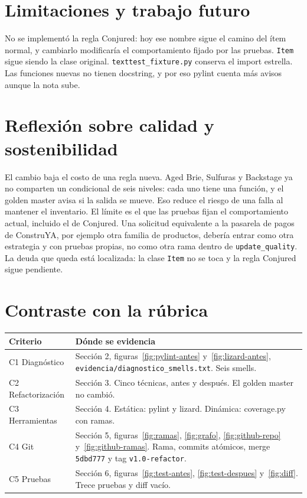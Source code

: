 \documentclass[10pt,a4paper]{article}
\begin{document}
\section{Limitaciones y trabajo futuro}
No se implementó la regla Conjured: hoy ese nombre sigue el camino del ítem normal, y cambiarlo modificaría el comportamiento fijado por las pruebas. \texttt{Item} sigue siendo la clase original. \texttt{texttest\_fixture.py} conserva el import estrella. Las funciones nuevas no tienen docstring, y por eso pylint cuenta más avisos aunque la nota sube.

\section{Reflexión sobre calidad y sostenibilidad}
El cambio baja el costo de una regla nueva. Aged Brie, Sulfuras y Backstage ya no comparten un condicional de seis niveles: cada uno tiene una función, y el golden master avisa si la salida se mueve. Eso reduce el riesgo de una falla al mantener el inventario. El límite es el que las pruebas fijan el comportamiento actual, incluido el de Conjured. Una solicitud equivalente a la pasarela de pagos de ConstruYA, por ejemplo otra familia de productos, debería entrar como otra estrategia y con pruebas propias, no como otra rama dentro de \texttt{update\_quality}. La deuda que queda está localizada: la clase \texttt{Item} no se toca y la regla Conjured sigue pendiente.

\section{Contraste con la rúbrica}
\begin{center}
\scriptsize
\begin{tabular}{|p{2.3cm}|p{12.6cm}|}
\hline
Criterio & Dónde se evidencia \\
\hline
C1 Diagnóstico & Sección 2, figuras~\ref{fig:pylint-antes} y~\ref{fig:lizard-antes}, \texttt{evidencia/diagnostico\_smells.txt}. Seis smells. \\
\hline
C2 Refactorización & Sección 3. Cinco técnicas, antes y después. El golden master no cambió. \\
\hline
C3 Herramientas & Sección 4. Estática: pylint y lizard. Dinámica: coverage.py con ramas. \\
\hline
C4 Git & Sección 5, figuras~\ref{fig:ramas}, \ref{fig:grafo}, \ref{fig:github-repo} y~\ref{fig:github-ramas}. Rama, commits atómicos, merge \texttt{5dbd777} y tag \texttt{v1.0-refactor}. \\
\hline
C5 Pruebas & Sección 6, figuras~\ref{fig:test-antes}, \ref{fig:test-despues} y~\ref{fig:diff}. Trece pruebas y diff vacío. \\
\hline
\end{tabular}
\end{center}
\end{document}
